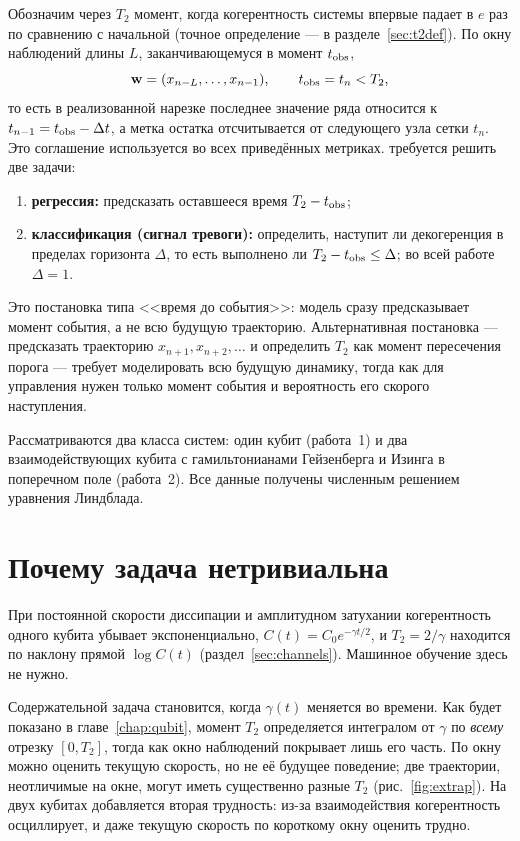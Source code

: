 \documentclass[12pt,a4paper]{report}
\numberwithin{equation}{chapter}
\newif\ifshownotes\shownotesfalse
\newcommand{\note}[1]{\ifshownotes\par{\color{red}\small\textbf{[Пометка]} #1}\par\fi}
\begin{document}
\note{Осталось: сравнить стоимость набора окна с прогнозируемым остатком
(для этого нужна длительность одного приготовления и измерения).}

Обозначим через $T_2$ момент, когда когерентность системы впервые падает в
$e$ раз по сравнению с начальной (точное определение --- в
разделе~\ref{sec:t2def}). По окну наблюдений длины $L$, заканчивающемуся в
момент $t_{\rm obs}$,
\[
\mathbf w=(x_{n-L},\dots,x_{n-1}),\qquad t_{\rm obs}=t_n<T_2,
\]
то есть в реализованной нарезке последнее значение ряда относится к
$t_{n-1}=t_{\rm obs}-\Delta t$, а метка остатка отсчитывается от следующего
узла сетки $t_n$. Это соглашение используется во всех приведённых метриках.
требуется решить две задачи:
\begin{enumerate}
\item \textbf{регрессия:} предсказать оставшееся время
      $T_2-t_{\rm obs}$;
\item \textbf{классификация (сигнал тревоги):} определить, наступит ли
      декогеренция в пределах горизонта $\Delta$, то есть выполнено ли
      $T_2-t_{\rm obs}\le\Delta$; во всей работе $\Delta=1$.
\end{enumerate}

Это постановка типа <<время до события>>: модель сразу предсказывает момент
события, а не всю будущую траекторию. Альтернативная постановка ---
предсказать траекторию $x_{n+1},x_{n+2},\dots$ и определить $T_2$ как момент
пересечения порога --- требует моделировать всю будущую динамику, тогда как
для управления нужен только момент события и вероятность его скорого
наступления.

Рассматриваются два класса систем: один кубит (работа~1) и два
взаимодействующих кубита с гамильтонианами Гейзенберга и Изинга в
поперечном поле (работа~2). Все данные получены численным решением уравнения
Линдблада.

\section{Почему задача нетривиальна}

При постоянной скорости диссипации и амплитудном затухании когерентность
одного кубита убывает экспоненциально, $C(t)=C_0e^{-\gamma t/2}$, и
$T_2=2/\gamma$ находится по наклону прямой $\log C(t)$
(раздел~\ref{sec:channels}). Машинное обучение здесь не нужно.

Содержательной задача становится, когда $\gamma(t)$ меняется во времени. Как
будет показано в главе~\ref{chap:qubit}, момент $T_2$ определяется интегралом
от $\gamma$ по \emph{всему} отрезку $[0,T_2]$, тогда как окно наблюдений
покрывает лишь его часть. По окну можно оценить текущую скорость, но не её
будущее поведение; две траектории, неотличимые на окне, могут иметь
существенно разные $T_2$ (рис.~\ref{fig:extrap}). На двух кубитах добавляется
вторая трудность: из-за взаимодействия когерентность осциллирует, и даже
текущую скорость по короткому окну оценить трудно.
\end{document}
